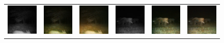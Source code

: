 \begin{figure}[htp!]
\begin{tabularx}{\textwidth}{Y Y Y !{\space} Y Y Y}
        \includegraphics{gfx/diffusion-sampling-full-vs-high-pass-filter-qual/nir_S2_B06_R1_PICT0387.jpg} & \includegraphics{gfx/diffusion-sampling-full-vs-high-pass-filter-qual/full-pass_S2_B06_R1_PICT0387.png} & \includegraphics{gfx/diffusion-sampling-full-vs-high-pass-filter-qual/high-pass_S2_B06_R1_PICT0387.png} & \includegraphics{gfx/diffusion-sampling-full-vs-high-pass-filter-qual/nir_S2_B06_R3_PICT1364.jpg} & \includegraphics{gfx/diffusion-sampling-full-vs-high-pass-filter-qual/full-pass_S2_B06_R3_PICT1364.png} & \includegraphics{gfx/diffusion-sampling-full-vs-high-pass-filter-qual/high-pass_S2_B06_R3_PICT1364.png} \\

\end{tabularx}
\end{figure}
